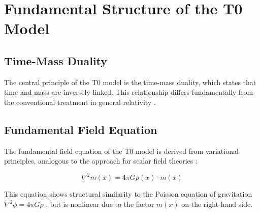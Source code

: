	\section{Fundamental Structure of the T0 Model}
	\label{sec:fundamental_structure}
	
	\subsection{Time-Mass Duality}
	\label{subsec:time_mass_duality}
	
	The central principle of the T0 model is the time-mass duality, which states that time and mass are inversely linked. This relationship differs fundamentally from the conventional treatment in general relativity \citep{einstein1915,misner1973}.
	
	\begin{table}[htbp]
		\centering
		\caption{Comparison of time-mass treatment in different theories}
		\label{tab:theory_comparison}
	\end{table}
	
	\subsection{Fundamental Field Equation}
	\label{subsec:field_equation}
	
	The fundamental field equation of the T0 model is derived from variational principles, analogous to the approach for scalar field theories \citep{weinberg1995}:
	
	\begin{equation}
		\label{eq:field_equation_fundamental}
		\nabla^2 m(x) = 4\pi G \rho(x) \cdot m(x)
	\end{equation}
	
	This equation shows structural similarity to the Poisson equation of gravitation $\nabla^2 \phi = 4\pi G \rho$ \citep{jackson1998}, but is nonlinear due to the factor $m(x)$ on the right-hand side.
	
